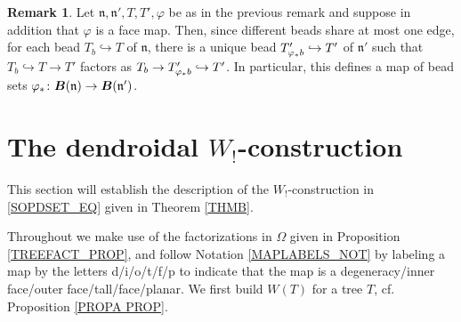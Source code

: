 \documentclass[a4paper,10pt
,draft
]{article}%
\numberwithin{equation}{section}
\numberwithin{figure}{section}
\theoremstyle{definition} %
\newtheorem{remark}[equation]{Remark}%
\newcommand{\1}{\ensuremath{\mathbbm 1}}%
\begin{document}
\begin{remark}\label{BEADMAP REM}
	Let $\mathfrak{n},\mathfrak{n}',T,T',\varphi$ be as in the previous remark and suppose in addition that $\varphi$ is a face map.
%
	Then, since different beads share at most one edge,
	for each bead $T_{b} \hookrightarrow T$
	of $\mathfrak{n}$,
	there is a unique bead
	$T'_{\varphi_{\**} b} \hookrightarrow T'$
	of $\mathfrak{n}'$
	such that
	$T_b \hookrightarrow T \to T'$
	factors as
	$T_b \to T'_{\varphi_{\**}b} \hookrightarrow T'$.
%	
	In particular, 
	this defines a map of bead sets
	$\varphi_{\**} \colon 
	\boldsymbol{B}(\mathfrak{n}) \to 
	\boldsymbol{B}(\mathfrak{n}')$.
\end{remark}




\section{The dendroidal $W_!$-construction}\label{WCONS SEC}

This section will establish the description
of the $W_!$-construction in \eqref{SOPDSET_EQ}
given in Theorem \ref{THMB}.

Throughout we make  
use of the factorizations in $\Omega$ given in 
Proposition \ref{TREEFACT_PROP},
and follow Notation \ref{MAPLABELS_NOT}
by labeling a map by the letters d/i/o/t/f/p
to indicate that the map is
a degeneracy/inner face/outer face/tall/face/planar.
We first build $W(T)$ for a tree $T$, cf. Proposition \ref{PROPA PROP}.
\end{document}
